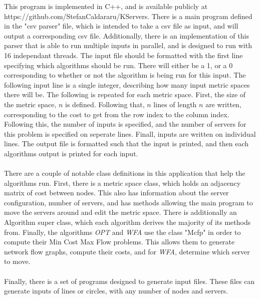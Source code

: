 This program is implemented in C++, and is available publicly at https://github.com/StefanCaldararu/KServers. There is a main program defined in the "csv parser" file, which is intended to take a csv file as input, and will output a corresponding csv file. Additionally, there is an implementation of this parser that is able to run multiple inputs in parallel, and is designed to run with 16 independant threads. The input file should be formatted with the first line specifying which algorithms should be run. There will either be a 1, or a 0 corresponding to whether or not the algorithm is being run for this input. The following input line is a single integer, describing how many input metric spaces there will be. The following is repeated for each metric space. First, the size of the metric space, $n$ is defined. Following that, $n$ lines of length $n$ are written, corresponding to the cost to get from the row index to the column index. Following this, the number of inputs is specified, and the number of servers for this problem is specified on seperate lines. Finall, inputs are written on individual lines. The output file is formatted such that the input is printed, and then each algorithms output is printed for each input.
\\ \\
There are a couple of notable class definitions in this application that help the algorithms run. First, there is a metric space class, which holds an adjacency matrix of cost between nodes. This also has information about the server configuration, number of servers, and has methods allowing the main program to move the servers around and edit the metric space. There is additionally an Algorithm super class, which each algorithm derives the majority of its methods from. Finally, the algorithms 
\textit{OPT} and \textit{WFA} use the class "Mcfp" in order to compute their Min Cost Max Flow problems. This allows them to generate network flow graphs, compute their costs, and for \textit{WFA}, determine which server to move.
\\ \\
Finally, there is a set of programs designed to generate input files. These files can generate inputs of lines or circles, with any number of nodes and servers.